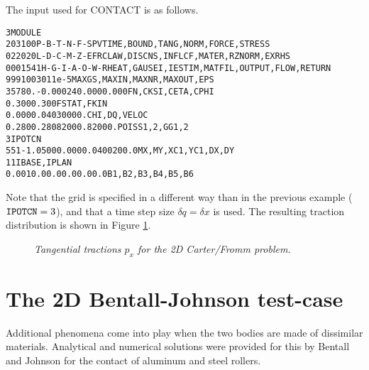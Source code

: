 \documentclass[12pt]{report}
\begin{document}
The input used for CONTACT is as follows.
\begin{alltt}\small
 3  MODULE
  203100     P-B-T-N-F-S        PVTIME, BOUND , TANG  , NORM , FORCE, STRESS
  022020     L-D-C-M-Z-E        FRCLAW, DISCNS, INFLCF, MATER, RZNORM, EXRHS
 0001541   H-G-I-A-O-W-R  HEAT, GAUSEI, IESTIM, MATFIL, OUTPUT, FLOW, RETURN
   999   100    30      1     1e-5     MAXGS , MAXIN , MAXNR , MAXOUT, EPS
  35780.   -0.00024  0.000    0.000            FN, CKSI, CETA, CPHI
   0.300    0.300                              FSTAT, FKIN
   0.000    0.040    30000.                    CHI, DQ, VELOC
   0.280    0.280    82000.   82000.           POISS 1,2,  GG 1,2
    3                                          IPOTCN
  55   1   -1.0500   0.000    0.0400   200.0   MX,MY,XC1,YC1,DX,DY
   1   1                                       IBASE, IPLAN
%  QUADRATIC UNDEFORMED DISTANCE
   0.001   0.0   0.0   0.0   0.0   0.0         B1,B2,B3,B4,B5,B6
%  UNRESTRICTED PLANFORM
\end{alltt}
Note that the grid is specified in a different way than in the previous
example (${\tt IPOTCN}=3$), and that a time step size $\delta q=\delta x$
is used. The resulting traction distribution is shown in Figure
\ref{fig:carter2d}.

\begin{figure}[bt]
\centering
{}
\caption{\em Tangential tractions $p_x$ for the 2D Carter/Fromm problem.}
\label{fig:carter2d}
\end{figure}

\section{The 2D Bentall-Johnson test-case}
\label{sec:ex_bentall}

Additional phenomena come into play when the two bodies are made of
dissimilar materials. Analytical and numerical solutions were provided for
this by Bentall and Johnson \cite{Bentall1967} for the contact of aluminum
and steel rollers.
\end{document}
